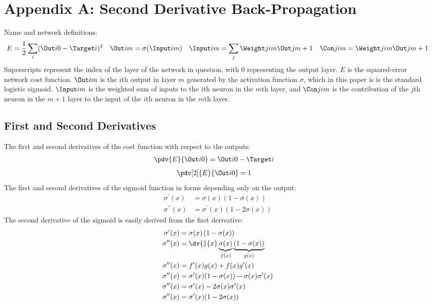 \pagebreak
\section{Appendix A: Second Derivative Back-Propagation}
Name and network definitions:\\
\begin{align}
E &= \frac{1}{2}\sum\limits_i (\Out i 0 - \Target i)^2 &
\Out i m &= \sigma(\Input i m) &
\Input i m &= \sum\limits_j {\Weight j i m}{ \Out j {m + 1}} &
\Con j i m = \Weight j i m \Out j {m+1}
\end{align}
Superscripts represent the index of the layer of the network in question, with 0 representing the output layer. $E$ is the squared-error network cost function. $\Out i m$ is the $i$th output in layer $m$ generated by the activation function $\sigma$, which in this paper is is the standard logistic sigmoid. $\Input i m$ is the weighted sum of inputs to the $i$th neuron in the $m$th layer, and $\Con j i m$ is the contribution of the $j$th neuron in the $m+1$ layer to the input of the $i$th neuron in the $m$th layer. 
\subsection{First and Second Derivatives} 
The first and second derivatives of the cost function with respect to the outputs:
\begin{align}
\pdv{E}{\Out i 0} &= \Out i 0 - \Target i \label{cost_func_derivative}
\end{align}
\begin{align}
\pdv[2]{E}{{\Out i 0}} &= 1\label{cost_func_2nd_derivative}
\end{align}
The first and second derivatives of the sigmoid function in forms depending only on the output:
\begin{align}
\sigma^{\prime}(x) &= \sigma(x)\left(1 - \sigma(x)\right)\label{sigmoid_derivative} 
\\
\sigma^{\prime\prime}(x) &= \sigma^{\prime}(x)\left(1 - 2\sigma(x)\right) \label{sigmoid_2nd_derivative}
\end{align}
The second derivative of the sigmoid is easily derived from the first derivative:
\begin{align}
\sigma^{\prime}(x) &= \sigma(x)\left(1 - \sigma(x)\right)
\\
\sigma^{\prime\prime}(x) &= \dv{}{x}
\underbrace{\sigma(x)}_{f(x)}
\underbrace{\left(1 - \sigma(x)\right)}_{g(x)}
\\
\sigma^{\prime\prime}(x) &= f^{\prime}(x)g(x) + f(x)g^{\prime}(x)
\\
\sigma^{\prime\prime}(x) &= \sigma^{\prime}(x)(1-\sigma(x)) - \sigma(x)\sigma^{\prime}(x)
\\
\sigma^{\prime\prime}(x) &= \sigma^{\prime}(x) - 2\sigma(x)\sigma^{\prime}(x)
\\
\sigma^{\prime\prime}(x) &= \sigma^{\prime}(x)(1 - 2\sigma(x))
\end{align}

